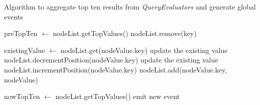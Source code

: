 \begin{algorithm}
\caption{Algorithm to aggregate top ten results from \textit{QueryEvaluators} and generate global events}
\label{aggregate_algorithm}
\begin{algorithmic}

\STATE preTopTen $\leftarrow$ nodeList.getTopValues()
	\STATE nodeList.remove(key)
\ENDFOR

		\STATE existingValue $\leftarrow$ nodeList.get(nodeValue.key)
			\STATE update the existing value
			\STATE nodeList.decrementPosition(nodeValue.key)
		\ELSE
			\STATE update the existing value
			\STATE nodeList.incrementPosition(nodeValue.key)
		\ENDIF
	\ELSE
		\STATE nodeList.add(nodeValue.key, nodeValue)
	\ENDIF
\ENDFOR

\STATE nowTopTen $\leftarrow$ nodeList.getTopValues()
	\STATE emit new event
\ENDIF
\end{algorithmic}
\end{algorithm}
